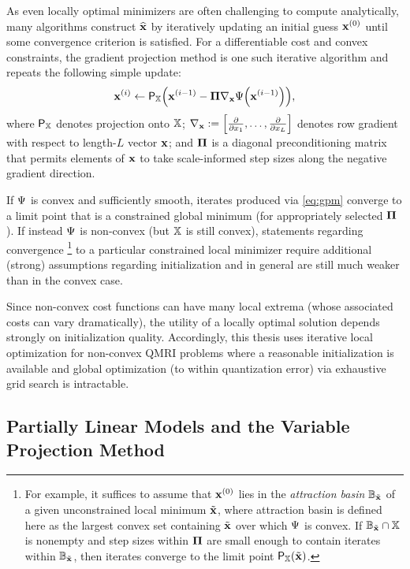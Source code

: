 As even locally optimal minimizers
are often challenging to compute analytically,
many algorithms construct $\widehat{\mathbf{x}}$ 
by iteratively updating
an initial guess $\bmxi{0}$
until some convergence criterion is satisfied.
For a differentiable cost
and convex constraints, 
the gradient projection method
\cite{rosen:60:tgp}
is one such iterative algorithm
and repeats the following simple update:
\begin{align}
	\bmxi{i} \gets \proja{\setX}{\bmxi{i-1}-\bmPi \grada{\bmx}\costa{\bmxi{i-1}}},
	\label{eq:gpm}
\end{align}
where $\mathsf{P}_{\mathbb{X}}$ denotes 
projection onto $\mathbb{X}$;
$\grada{\bmx} := \brac{\dela{x_1},\dots,\dela{x_L}}$ denotes
row gradient with respect to length-$L$ vector $\mathbf{x}$;
and $\boldsymbol{\Pi}$ is a diagonal preconditioning matrix
that permits elements of $\mathbf{x}$
to take scale-informed step sizes
along the negative gradient direction.

If $\Psi$ is convex and sufficiently smooth,
iterates produced via \eqref{eq:gpm} 
converge to a limit point \cite{byrne:04:aut}
that is a constrained global minimum
(for appropriately selected $\boldsymbol{\Pi}$).
If instead $\Psi$ is non-convex 
(but $\mathbb{X}$ is still convex),
statements regarding convergence
\footnote{For example, 
it suffices to assume
that $\bmxi{0}$ lies
in the \emph{attraction basin} $\mathbb{B}_{\tilde{\mathbf{x}}}$
of a given unconstrained local minimum $\tilde{\mathbf{x}}$, 
where attraction basin 
is defined here as the largest convex set
containing $\tilde{\mathbf{x}}$ 
over which $\Psi$ is convex.
If $\mathbb{B}_{\tilde{\mathbf{x}}} \cap \mathbb{X}$ is nonempty 
and step sizes within $\boldsymbol{\Pi}$ are small enough 
to contain iterates
within $\mathbb{B}_{\tilde{\mathbf{x}}}$,
then iterates converge
to the limit point $\proja{\setX}{\bmxt}$.
}
to a particular constrained local minimizer
require additional (strong) assumptions
regarding initialization
and in general 
are still much weaker 
than in the convex case.

Since non-convex cost functions
can have many local extrema
(whose associated costs can vary dramatically),
the utility of a locally optimal solution
depends strongly on initialization quality.
Accordingly,
this thesis uses iterative local optimization
for non-convex QMRI problems
where a reasonable initialization is available
and global optimization (to within quantization error) 
via exhaustive grid search
is intractable.

\subsection{Partially Linear Models and the Variable Projection Method}
\label{ss,bkgrd,opt,vpm}


